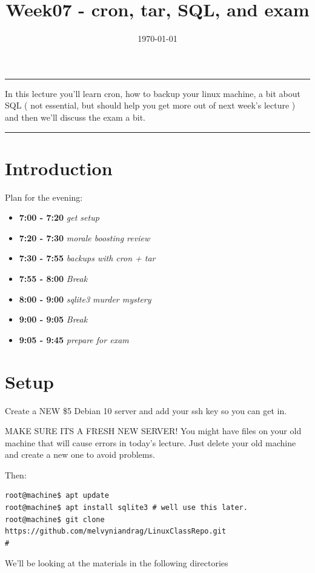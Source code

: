 \documentclass[12pt,a4paper]{article}
\newcommand{\schedule}[2]{\textbf{#1} \textit{#2}}
\renewenvironment{abstract}{%
\hfill\begin{minipage}{0.95\textwidth}
\rule{\textwidth}{1pt}}
{\par\noindent\rule{\textwidth}{1pt}\end{minipage}}
\begin{document}
%
\title{\textbf{Week07 - cron, tar, SQL, and exam}}
\date{\today}
%
\maketitle
%
\begin{abstract}
In this lecture you'll learn cron, how to backup your linux machine, a bit about
SQL ( not essential, but should help you get more out of next week's lecture )
and then we'll discuss the exam a bit.
\end{abstract}

\section{Introduction}
Plan for the evening:
\begin{itemize}
\setlength\itemsep{0em}
\item \schedule{7:00 - 7:20}{get setup}
\item \schedule{7:20 - 7:30}{morale boosting review}
\item \schedule{7:30 - 7:55}{backups with cron + tar}
\item \schedule{7:55 - 8:00}{Break}
\item \schedule{8:00 - 9:00}{sqlite3 murder mystery}
\item \schedule{9:00 - 9:05}{Break}
\item \schedule{9:05 - 9:45}{prepare for exam}
\end{itemize}

\section{Setup}

Create a NEW \$5 Debian 10 server and add your ssh key so you can get in.

{\LARGE MAKE SURE ITS A FRESH NEW SERVER! You might have files on your old
machine that will cause errors in today's lecture. Just delete your old machine
and create a new one to avoid problems.}

Then:
\begin{lstlisting}[style=term]
root@machine$ apt update
root@machine$ apt install sqlite3 # well use this later.
root@machine$ git clone https://github.com/melvyniandrag/LinuxClassRepo.git
#\end{lstlisting}

We'll be looking at the materials in the following directories
\end{document}
